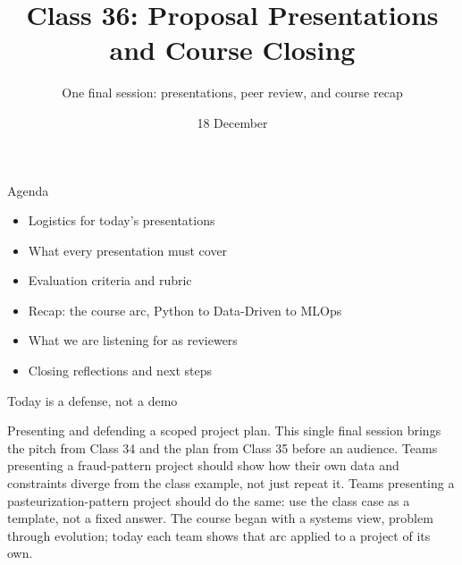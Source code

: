 

\title{Class 36: Proposal Presentations and Course Closing}
\subtitle{One final session: presentations, peer review, and course recap}
\author{\coursename}
\date{18 December}



\frame{\titlepage \coursefooter}

\begin{frame}{Agenda}
\begin{itemize}
\item Logistics for today's presentations
\item What every presentation must cover
\item Evaluation criteria and rubric
\item Recap: the course arc, Python to Data-Driven to MLOps
\item What we are listening for as reviewers
\item Closing reflections and next steps
\end{itemize}
\coursefooter
\end{frame}

\begin{frame}{Today is a defense, not a demo}
\coursefooter
\end{frame}

\coursecontextframe
{Presenting and defending a scoped project plan.}
{This single final session brings the pitch from Class 34 and the plan from Class 35 before an audience.}
{Teams presenting a fraud-pattern project should show how their own data and constraints diverge from the class example, not just repeat it.}
{Teams presenting a pasteurization-pattern project should do the same: use the class case as a template, not a fixed answer.}
{The course began with a systems view, problem through evolution; today each team shows that arc applied to a project of its own.}

